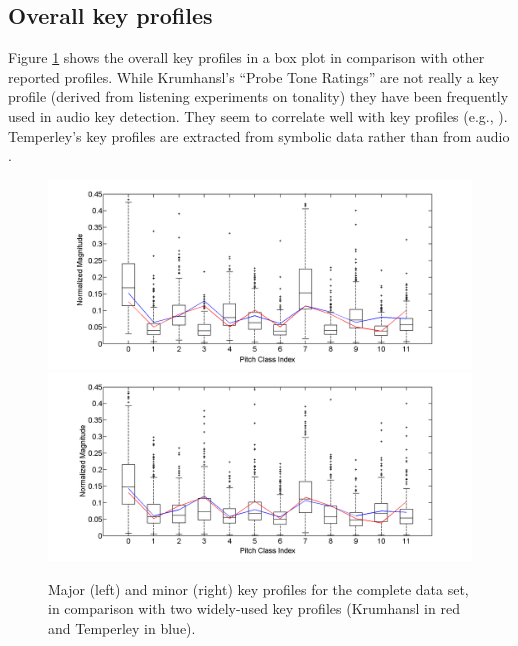 \documentclass{article}
\begin{document}
\subsection{Overall key profiles}
Figure \ref{fig:OverallKeyProfiles} shows the overall key profiles in a box plot in comparison with other reported profiles. 
While Krumhansl's ``Probe Tone Ratings'' \cite{krumhansl_cognitive_1990} are not really a key profile (derived from listening experiments on tonality) they have been frequently used in audio key detection. They seem to correlate well with key profiles (e.g., \cite{izmirli_template_2005}). 
Temperley's key profiles are extracted from symbolic data  rather than from audio \cite{temperley_bayesian_2004,temperley_pitch-class_2008}.
\begin{figure}[tb]
    \includegraphics[scale=.2]{graph/allMajChroma+Krum+Temp}
    \includegraphics[scale=.2]{graph/allMinChroma+Krum+Temp}
	\caption{Major (left) and minor (right) key profiles for the complete data set, in comparison with two widely-used key profiles (Krumhansl in red and Temperley in blue).}
	\label{fig:OverallKeyProfiles}
\end{figure}
\end{document}
